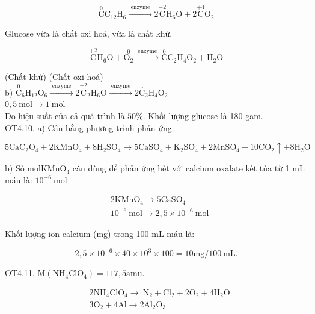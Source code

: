 \documentclass[10pt]{article}
\begin{document}
\begin{equation*}
\stackrel{0}{\mathrm{C}} \mathrm{C}_{12} \mathrm{H}_{6} \xrightarrow{\text { enzyme }} 2 \stackrel{+2}{\mathrm{C}} \mathrm{H}_{6} \mathrm{O}+2 \stackrel{+4}{\mathrm{C}} \mathrm{O}_{2} \tag{1}
\end{equation*}


Glucose vừa là chất oxi hoá, vừa là chất khử.


\begin{equation*}
\stackrel{+2}{\mathrm{C}} \mathrm{H}_{6} \mathrm{O}+\stackrel{0}{\mathrm{O}_{2}} \xrightarrow{\text { enzyme }} \stackrel{0}{\mathrm{C}} \mathrm{C}_{2} \mathrm{H}_{4} \mathrm{O}_{2}+\mathrm{H}_{2} \mathrm{O} \tag{2}
\end{equation*}


(Chất khử) (Chất oxi hoá)\\
b) $\stackrel{0}{\mathrm{C}}{ }_{6} \mathrm{H}_{12} \mathrm{O}_{6} \xrightarrow{\text { enzyme }} 2 \stackrel{+2}{\mathrm{C}}{ }_{2} \mathrm{H}_{6} \mathrm{O} \xrightarrow{\text { enzyme }} 2 \stackrel{\circ}{\mathrm{C}}{ }_{2} \mathrm{H}_{4} \mathrm{O}_{2}$\\
$0,5 \mathrm{~mol} \rightarrow 1 \mathrm{~mol}$\\
Do hiệu suất của cả quá trình là $50 \%$. Khối lượng glucose là 180 gam.\\
OT4.10. a) Cân bằng phương trình phản ứng.

$$
5 \mathrm{CaC}_{2} \mathrm{O}_{4}+2 \mathrm{KMnO}_{4}+8 \mathrm{H}_{2} \mathrm{SO}_{4} \rightarrow 5 \mathrm{CaSO}_{4}+\mathrm{K}_{2} \mathrm{SO}_{4}+2 \mathrm{MnSO}_{4}+10 \mathrm{CO}_{2} \uparrow+8 \mathrm{H}_{2} \mathrm{O}
$$

b) Số $\mathrm{mol} \mathrm{KMnO}_{4}$ cần dùng để phản ứng hết với calcium oxalate kết tủa từ 1 mL máu là: $10^{-6} \mathrm{~mol}$

$$
\begin{aligned}
& 2 \mathrm{KMnO}_{4} \rightarrow 5 \mathrm{CaSO}_{4} \\
& 10^{-6} \mathrm{~mol} \rightarrow 2,5 \times 10^{-6} \mathrm{~mol}
\end{aligned}
$$

Khối lượng ion calcium (mg) trong 100 mL máu là:

$$
2,5 \times 10^{-6} \times 40 \times 10^{3} \times 100=10 \mathrm{mg} / 100 \mathrm{~mL} .
$$

OT4.11. $\mathrm{M}\left(\mathrm{NH}_{4} \mathrm{ClO}_{4}\right)=117,5 \mathrm{amu}$.

$$
\begin{aligned}
& 2 \mathrm{NH}_{4} \mathrm{ClO}_{4} \rightarrow \mathrm{~N}_{2}+\mathrm{Cl}_{2}+2 \mathrm{O}_{2}+4 \mathrm{H}_{2} \mathrm{O} \\
& 3 \mathrm{O}_{2}+4 \mathrm{Al} \rightarrow 2 \mathrm{Al}_{2} \mathrm{O}_{3}
\end{aligned}
$$
\end{document}
